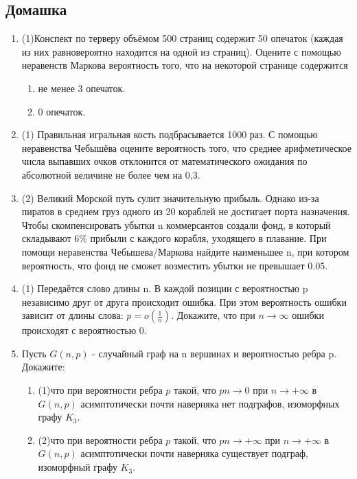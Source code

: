 \documentclass[a4paper, 14pt]{extarticle}
\begin{document}
\subsection*{Домашка}
\begin{enumerate}
\item (1)Конспект по терверу объёмом 500 страниц содержит 50 опечаток (каждая из них равновероятно находится на одной из страниц). Оцените с помощью неравенств Маркова вероятность того, что на некоторой странице содержится 
\begin{enumerate}
    \item не менее 3 опечаток.
    \item 0 опечаток.
\end{enumerate}
\item (1) Правильная игральная кость подбрасывается 1000 раз. 
С помощью неравенства Чебышёва оцените вероятность того, 
что среднее арифметическое числа выпавших очков отклонится от математического ожидания по абсолютной величине не более чем на 0,3. 
\item (2) Великий Морской путь сулит значительную прибыль. Однако из-за пиратов в среднем груз одного из 20 кораблей не достигает порта назначения. Чтобы скомпенсировать убытки n коммерсантов создали фонд, в который складывают $6\%$ прибыли с каждого корабля, уходящего в плавание. При помощи неравенства Чебышева/Маркова найдите наименьшее n, при котором вероятность, что фонд не сможет возместить убытки не превышает 0.05.
\item (1) Передаётся слово длины n. В каждой позиции с вероятностью p независимо друг от друга происходит ошибка. При этом вероятность ошибки зависит от длины слова: $p = o(\frac{1}{n})$. Докажите, что при $n \to \infty$ ошибки происходят с вероятностью 0.
\item Пусть $G(n,p)$ - случайный граф на n вершинах и вероятностью ребра p. Докажите: 
\begin{enumerate}
    \item (1)что при вероятности ребра $p$ такой, что $pn \to 0$ при $n\to +\infty$ в $G(n,p)$ асимптотически почти наверняка нет подграфов, изоморфных графу $K_3$.
    \item (2)что при вероятности ребра $p$ такой, что $pn \to +\infty$ при $n\to +\infty$ в $G(n,p)$ асимптотически почти наверняка существует подграф, изоморфный графу $K_3$.
\end{enumerate}


\end{enumerate}
\end{document}
